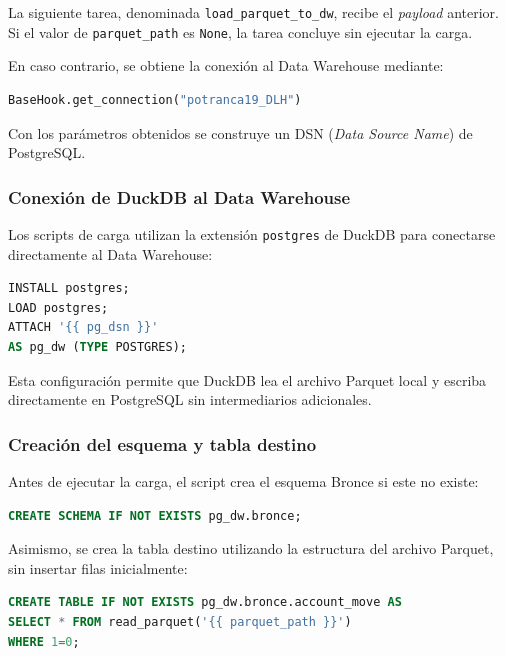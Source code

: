 La siguiente tarea, denominada \texttt{load\_parquet\_to\_dw}, recibe el \textit{payload} anterior. Si el valor de \texttt{parquet\_path} es \texttt{None}, la tarea concluye sin ejecutar la carga.

En caso contrario, se obtiene la conexión al Data Warehouse mediante:

\begin{lstlisting}[language=Python, breaklines=true]
BaseHook.get_connection("potranca19_DLH")
\end{lstlisting}

Con los parámetros obtenidos se construye un DSN (\textit{Data Source Name}) de PostgreSQL.

\subsubsection{Conexión de DuckDB al Data Warehouse}

Los scripts de carga utilizan la extensión \texttt{postgres} de DuckDB para conectarse directamente al Data Warehouse:

\begin{lstlisting}[language=SQL, breaklines=true]
INSTALL postgres;
LOAD postgres;
ATTACH '{{ pg_dsn }}'
AS pg_dw (TYPE POSTGRES);
\end{lstlisting}

Esta configuración permite que DuckDB lea el archivo Parquet local y escriba directamente en PostgreSQL sin intermediarios adicionales.

\subsubsection{Creación del esquema y tabla destino}

Antes de ejecutar la carga, el script crea el esquema Bronce si este no existe:

\begin{lstlisting}[language=SQL, breaklines=true]
CREATE SCHEMA IF NOT EXISTS pg_dw.bronce;
\end{lstlisting}

Asimismo, se crea la tabla destino utilizando la estructura del archivo Parquet, sin insertar filas inicialmente:

\begin{lstlisting}[language=SQL, breaklines=true]
CREATE TABLE IF NOT EXISTS pg_dw.bronce.account_move AS
SELECT * FROM read_parquet('{{ parquet_path }}')
WHERE 1=0;
\end{lstlisting}


